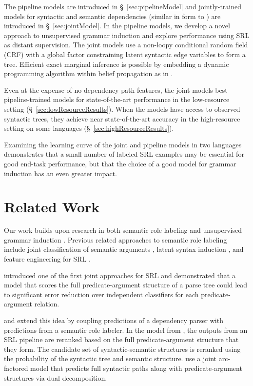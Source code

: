 \documentclass[11pt]{article}
\begin{document}
The pipeline models are introduced in
\S~\ref{sec:pipelineModel} and jointly-trained models for syntactic
and semantic dependencies (similar in form to
) are introduced in \S~\ref{sec:jointModel}.  
In the pipeline models, we develop a novel approach to unsupervised
grammar induction and explore performance using SRL as distant
supervision.
The joint models use a non-loopy conditional random field (CRF) with a
global factor constraining latent syntactic edge variables to form a
tree. Efficient exact marginal inference is possible by embedding a
dynamic programming algorithm within belief propagation as in
.

Even at the expense of no dependency path features, the joint models
best pipeline-trained models for state-of-the-art performance in
the low-resource setting (\S~\ref{sec:lowResourceResults}).  When the
models have access to observed syntactic trees, they achieve
near state-of-the-art accuracy in the high-resource setting on some languages
(\S~\ref{sec:highResourceResults}).

Examining the learning curve of the joint and pipeline models in two languages 
demonstrates that a small number of labeled SRL examples may be essential 
for good end-task performance, but that the choice of a good model for grammar induction has an even greater impact.

\section{Related Work}
\label{sec:relatedwork}

Our work builds upon research in both semantic role labeling and 
unsupervised grammar induction
\cite{klein_corpus-based_2004,spitkovsky_viterbi_2010}. 
Previous related approaches to 
semantic role labeling include joint classification of semantic arguments 
\cite{toutanova_joint_2005,johansson_dependency-based_2008}, 
latent syntax induction \cite{boxwell_semantic_2011,naradowsky_improving_2012}, 
and feature engineering for SRL 
\cite{zhao_multilingual_2009,bjorkelund_multilingual_2009}.

 introduced one of the first joint approaches for SRL and
demonstrated that a 
model that scores the full predicate-argument
structure of a parse tree could lead to significant error reduction over 
independent classifiers for each predicate-argument relation.  

 and  
extend this idea by coupling predictions of a dependency parser with 
predictions from a semantic role labeler.  In the model from 
, the outputs from an 
 SRL pipeline are reranked based on the full predicate-argument structure
that they form.  The candidate set of syntactic-semantic structures is reranked 
using the probability of the syntactic tree and semantic structure.  
 use a joint arc-factored model that
predicts full syntactic paths along with predicate-argument structures
via dual decomposition.
\end{document}
